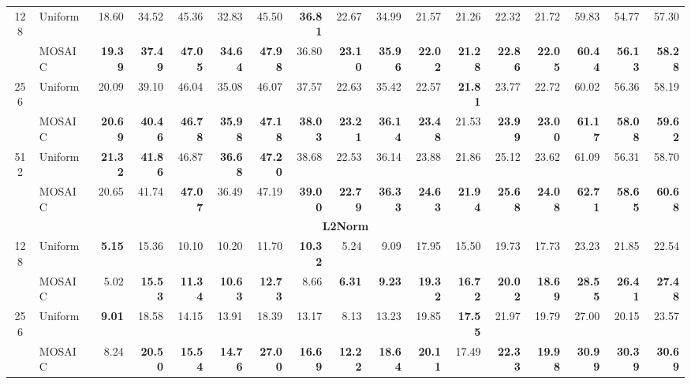 \begin{table}[tp]
\begin{tabular}{@{} c l rrrr rrrr rrrr rrr @{}}
    \midrule
    \multirow{2}{*}{128} & Uniform & 18.60 & 34.52 & 45.36 & 32.83 & 45.50 & \textbf{36.81} & 22.67 & 34.99 & 21.57 & 21.26 & 22.32 & 21.72 & 59.83 & 54.77 & 57.30 \\
     & MOSAIC & \textbf{19.39} & \textbf{37.49} & \textbf{47.05} & \textbf{34.64} & \textbf{47.98} & 36.80 & \textbf{23.10} & \textbf{35.96} & \textbf{22.02} & \textbf{21.28} & \textbf{22.86} & \textbf{22.05} & \textbf{60.44} & \textbf{56.13} & \textbf{58.28} \\
    \cmidrule(l){1-17}
    \multirow{2}{*}{256} & Uniform & 20.09 & 39.10 & 46.04 & 35.08 & 46.07 & 37.57 & 22.63 & 35.42 & 22.57 & \textbf{21.81} & 23.77 & 22.72 & 60.02 & 56.36 & 58.19 \\
     & MOSAIC & \textbf{20.69} & \textbf{40.46} & \textbf{46.78} & \textbf{35.98} & \textbf{47.18} & \textbf{38.03} & \textbf{23.21} & \textbf{36.14} & \textbf{23.48} & 21.53 & \textbf{23.99} & \textbf{23.00} & \textbf{61.17} & \textbf{58.08} & \textbf{59.62} \\
    \cmidrule(l){1-17}
    \multirow{2}{*}{512} & Uniform & \textbf{21.32} & \textbf{41.86} & 46.87 & \textbf{36.68} & \textbf{47.20} & 38.68 & 22.53 & 36.14 & 23.88 & 21.86 & 25.12 & 23.62 & 61.09 & 56.31 & 58.70 \\
     & MOSAIC & 20.65 & 41.74 & \textbf{47.07} & 36.49 & 47.19 & \textbf{39.00} & \textbf{22.79} & \textbf{36.33} & \textbf{24.63} & \textbf{21.94} & \textbf{25.68} & \textbf{24.08} & \textbf{62.71} & \textbf{58.65} & \textbf{60.68} \\
    \midrule
    \multicolumn{17}{c}{\textbf{L2Norm}} \\
    \midrule
    \multirow{2}{*}{128} & Uniform & \textbf{5.15} & 15.36 & 10.10 & 10.20 & 11.70 & \textbf{10.32} & 5.24 & 9.09 & 17.95 & 15.50 & 19.73 & 17.73 & 23.23 & 21.85 & 22.54 \\
     & MOSAIC & 5.02 & \textbf{15.53} & \textbf{11.34} & \textbf{10.63} & \textbf{12.73} & 8.66 & \textbf{6.31} & \textbf{9.23} & \textbf{19.32} & \textbf{16.72} & \textbf{20.02} & \textbf{18.69} & \textbf{28.55} & \textbf{26.41} & \textbf{27.48} \\
    \cmidrule(l){1-17}
    \multirow{2}{*}{256} & Uniform & \textbf{9.01} & 18.58 & 14.15 & 13.91 & 18.39 & 13.17 & 8.13 & 13.23 & 19.85 & \textbf{17.55} & 21.97 & 19.79 & 27.00 & 20.15 & 23.57 \\
     & MOSAIC & 8.24 & \textbf{20.50} & \textbf{15.54} & \textbf{14.76} & \textbf{27.00} & \textbf{16.69} & \textbf{12.22} & \textbf{18.64} & \textbf{20.11} & 17.49 & \textbf{22.33} & \textbf{19.98} & \textbf{30.99} & \textbf{30.39} & \textbf{30.69} \\

\end{tabular}
\end{table}

